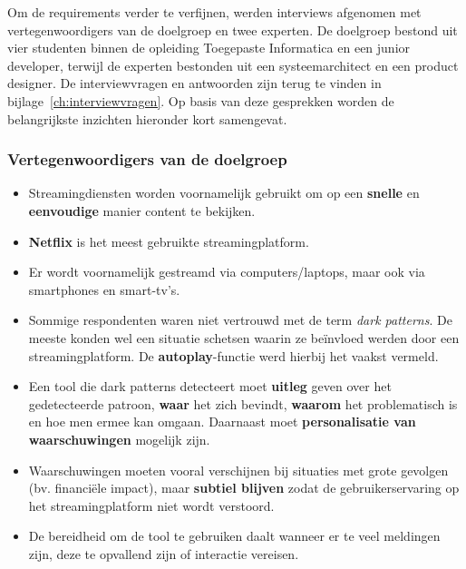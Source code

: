 \vspace{1em}

Om de requirements verder te verfijnen, werden interviews afgenomen met vertegenwoordigers van de doelgroep en twee experten. De doelgroep bestond uit vier studenten binnen de opleiding Toegepaste Informatica en een junior developer, terwijl de experten bestonden uit een systeemarchitect en een product designer. De interviewvragen en antwoorden zijn terug te vinden in bijlage~\ref{ch:interviewvragen}. Op basis van deze gesprekken worden de belangrijkste inzichten hieronder kort samengevat.

\vspace{1em}

\subsubsection{Vertegenwoordigers van de doelgroep}

\vspace{1em}

\begin{itemize}
    \item Streamingdiensten worden voornamelijk gebruikt om op een \textbf{snelle} en \textbf{eenvoudige} manier content te bekijken.
    \item \textbf{Netflix} is het meest gebruikte streamingplatform.
    \item Er wordt voornamelijk gestreamd via computers/laptops, maar ook via smartphones en smart-tv's.
    \item Sommige respondenten waren niet vertrouwd met de term \textit{dark patterns}. De meeste konden wel een situatie schetsen waarin ze beïnvloed werden door een streamingplatform. De \textbf{autoplay}-functie werd hierbij het vaakst vermeld.
    \item Een tool die dark patterns detecteert moet \textbf{uitleg} geven over het gedetecteerde patroon, \textbf{waar} het zich bevindt, \textbf{waarom} het problematisch is en hoe men ermee kan omgaan. Daarnaast moet \textbf{personalisatie van waarschuwingen} mogelijk zijn.
    \item Waarschuwingen moeten vooral verschijnen bij situaties met grote gevolgen (bv. financiële impact), maar \textbf{subtiel blijven} zodat de gebruikerservaring op het streamingplatform niet wordt verstoord.
    \item De bereidheid om de tool te gebruiken daalt wanneer er te veel meldingen zijn, deze te opvallend zijn of interactie vereisen.
\end{itemize}

